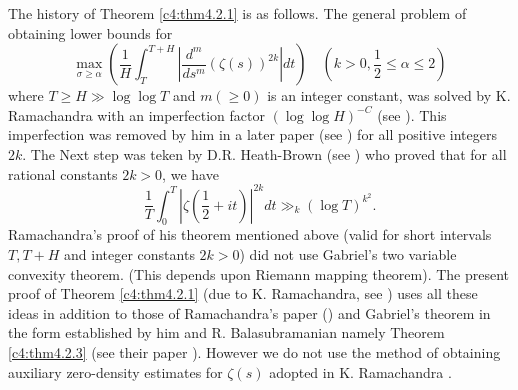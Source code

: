 The history of Theorem \ref{c4:thm4.2.1} is as follows. The general problem of obtaining lower bounds for
$$
\max\limits_{\sigma \geq \alpha} \left(\frac{1}{H} \int^{T+H}_T |\frac{d^m}{ds^m} (\zeta(s))^{2k} | dt \right) \quad \left(k > 0,\frac{1}{2} \leq \alpha \leq 2 \right)
$$
where $T \geq H \gg \log \log T$ and $m(\geq 0)$ is an integer constant, was solved by K. Ramachandra with an imperfection factor $(\log \log H)^{-C}$ (see \cite{Ramachandra13}). This imperfection was removed by him in a later paper (see \cite{Ramachandra14}) for all positive integers $2k$. The Next step was teken by D.R. Heath-Brown (see \cite{Heath-Brown1}) who proved that for all rational constants $2k > 0$, we have
$$
\frac{1}{T} \int^T_0 |\zeta \left(\frac{1}{2} + it \right)|^{2k} dt \gg_k (\log T)^{k^2}.
$$
Ramachandra's proof of his theorem mentioned above (valid for short intervals $T,T+H$ and integer constants $2k >0$) did not use Gabriel's two variable convexity theorem. (This depends upon Riemann mapping theorem). The present proof of Theorem \ref{c4:thm4.2.1} (due to K. Ramachandra, see \cite{Ramachandra15}) uses all these ideas in addition to those of Ramachandra's paper (\cite{Ramachandra16}) and Gabriel's theorem in the form established by him and R. Balasubramanian namely Theorem \ref{c4:thm4.2.3} (see their paper \cite{Ramachandra4}). However we do not use the method of obtaining auxiliary zero-density estimates for $\zeta(s)$ adopted in K. Ramachandra \cite{Ramachandra13}. 

